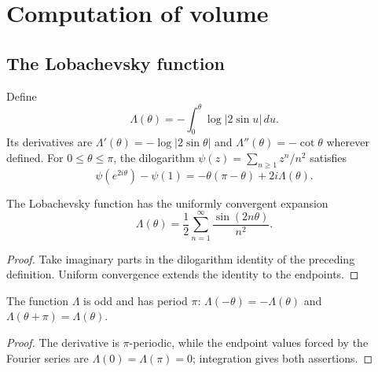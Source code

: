 \chapter{Computation of volume}

\section{The Lobachevsky function}

\begin{definition}
\label{thurston-ch07-lobachevsky-function}

Define
\[
\Lambda(\theta)=-\int_0^\theta\log|2\sin u|\,du.
\]
Its derivatives are $\Lambda'(\theta)=-\log|2\sin\theta|$ and
$\Lambda''(\theta)=-\cot\theta$ wherever defined.  For $0\leq\theta\leq\pi$,
the dilogarithm $\psi(z)=\sum_{n\geq1}z^n/n^2$ satisfies
\[
\psi(e^{2i\theta})-\psi(1)=-\theta(\pi-\theta)+2i\Lambda(\theta).
\]
\end{definition}

\begin{lemma}
\label{thurston-ch07-lobachevsky-fourier}

The Lobachevsky function has the uniformly convergent expansion
\[
\Lambda(\theta)=\frac12\sum_{n=1}^{\infty}\frac{\sin(2n\theta)}{n^2}.
\]
\end{lemma}
\begin{proof}
\sketch
Take imaginary parts in the dilogarithm identity of the preceding definition.  Uniform convergence extends the identity to the endpoints.
\end{proof}

\begin{lemma}
\label{thurston-ch07-lobachevsky-symmetries}

The function $\Lambda$ is odd and has period $\pi$:
$\Lambda(-\theta)=-\Lambda(\theta)$ and $\Lambda(\theta+\pi)=\Lambda(\theta)$.
\end{lemma}
\begin{proof}
\sketch
The derivative is $\pi$-periodic, while the endpoint values forced by the Fourier series are $\Lambda(0)=\Lambda(\pi)=0$; integration gives both assertions.
\end{proof}

